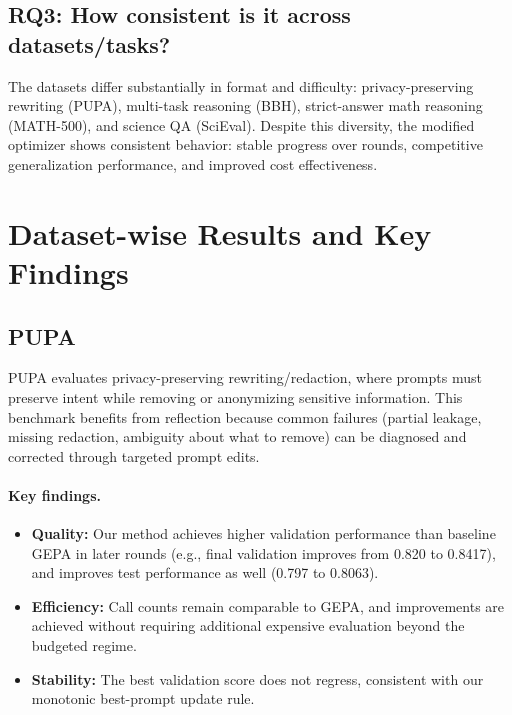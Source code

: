 \subsection*{RQ3: How consistent is it across datasets/tasks?}
The datasets differ substantially in format and difficulty: privacy-preserving rewriting (PUPA), multi-task reasoning (BBH), strict-answer math reasoning (MATH-500), and science QA (SciEval). Despite this diversity, the modified optimizer shows consistent behavior: stable progress over rounds, competitive generalization performance, and improved cost effectiveness.

\section{Dataset-wise Results and Key Findings}

\subsection{PUPA}
PUPA evaluates privacy-preserving rewriting/redaction, where prompts must preserve intent while removing or anonymizing sensitive information. This benchmark benefits from reflection because common failures (partial leakage, missing redaction, ambiguity about what to remove) can be diagnosed and corrected through targeted prompt edits.

\paragraph{Key findings.}
\begin{itemize}
    \item \textbf{Quality:} Our method achieves higher validation performance than baseline GEPA in later rounds (e.g., final validation improves from 0.820 to 0.8417), and improves test performance as well (0.797 to 0.8063).
    \item \textbf{Efficiency:} Call counts remain comparable to GEPA, and improvements are achieved without requiring additional expensive evaluation beyond the budgeted regime.
    \item \textbf{Stability:} The best validation score does not regress, consistent with our monotonic best-prompt update rule.
\end{itemize}

